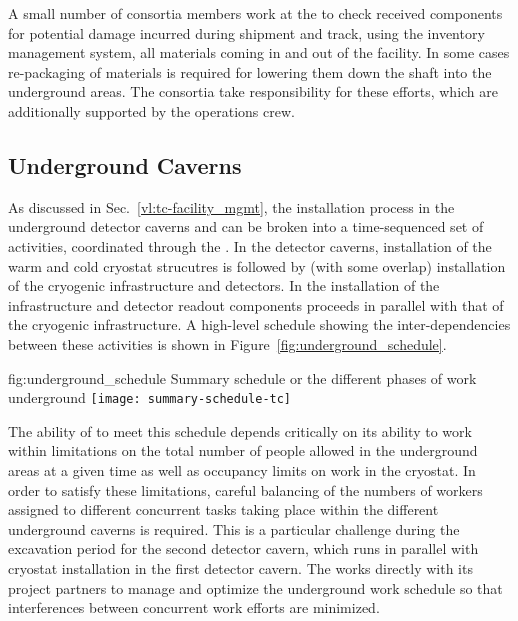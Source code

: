 A small number of  consortia members work at
the  to check received components for potential damage 
incurred during shipment and track, using the inventory management 
system, all materials coming in and out of the facility.  In some 
cases re-packaging of materials is required for lowering them down
the shaft into the underground areas.  The  consortia
take responsibility for these efforts, which are additionally
supported by the  operations crew.   

\subsection{Underground Caverns}

As discussed in Sec.~\ref{vl:tc-facility_mgmt}, the installation 
process in the underground detector caverns and  can 
be broken into a time-sequenced set of activities, coordinated 
through the .  In the detector caverns, installation 
of the warm and cold cryostat strucutres is followed by (with 
some overlap) installation of the cryogenic infrastructure and 
detectors.  In the  installation of the   
infrastructure and detector readout components proceeds in 
parallel with that of the cryogenic infrastructure.  A high-level 
schedule showing the inter-dependencies between these activities 
is shown in Figure~\ref{fig:underground_schedule}.
\begin{dunefigure}{fig:underground_schedule}
  {Summary schedule or the different phases of work underground}
  \texttt{[image: summary-schedule-tc]}
\end{dunefigure}

The ability of  to meet this schedule depends
critically on its ability to work within limitations on the total
number of people allowed in the underground areas at a given time as
well as occupancy limits on work in the cryostat.  In order to satisfy
these limitations, careful balancing of the numbers of workers
assigned to different concurrent tasks taking place within the
different underground caverns is required.  This is a particular
challenge during the excavation period for the second detector cavern,
which runs in parallel with cryostat installation in the first
detector cavern.  The  works directly with its
 project partners to manage and optimize the
underground work schedule so that interferences between concurrent
work efforts are minimized.

